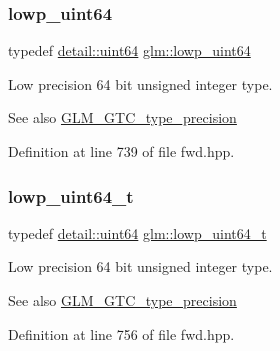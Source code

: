 \subsubsection{\texorpdfstring{lowp\+\_\+uint64}{lowp\_uint64}}
{\footnotesize\ttfamily typedef \hyperlink{namespaceglm_1_1detail_adec4b19bf4982125e122db2fe03c5810}{detail\+::uint64} \hyperlink{group__gtc__type__precision_gacf666a9d9b309c4615c7a4f2ab0be289}{glm\+::lowp\+\_\+uint64}}

Low precision 64 bit unsigned integer type. \begin{DoxySeeAlso}{See also}
\hyperlink{group__gtc__type__precision}{G\+L\+M\+\_\+\+G\+T\+C\+\_\+type\+\_\+precision} 
\end{DoxySeeAlso}


Definition at line 739 of file fwd.\+hpp.

\mbox{\label{group__gtc__type__precision_gabf3069d4f188557a87b1d7f35eb0a270}} 
\subsubsection{\texorpdfstring{lowp\+\_\+uint64\+\_\+t}{lowp\_uint64\_t}}
{\footnotesize\ttfamily typedef \hyperlink{namespaceglm_1_1detail_adec4b19bf4982125e122db2fe03c5810}{detail\+::uint64} \hyperlink{group__gtc__type__precision_gabf3069d4f188557a87b1d7f35eb0a270}{glm\+::lowp\+\_\+uint64\+\_\+t}}

Low precision 64 bit unsigned integer type. \begin{DoxySeeAlso}{See also}
\hyperlink{group__gtc__type__precision}{G\+L\+M\+\_\+\+G\+T\+C\+\_\+type\+\_\+precision} 
\end{DoxySeeAlso}


Definition at line 756 of file fwd.\+hpp.

\mbox{\label{group__gtc__type__precision_ga4d9dc08b7b248a386dfe9afd00fc6b1e}} 
